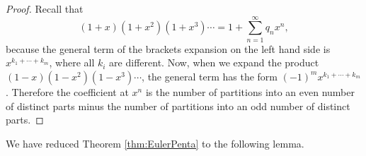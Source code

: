 

\setcounter{section}{3}
\setcounter{subsection}{8}
\setcounter{dfn}{21}

\begin{proof}
Recall that
\[
(1+x)(1+x^2)(1+x^3) \cdots = 1 + \sum_{n=1}^\infty q_n x^n,
\]
because the general term of the brackets expansion on the left hand side is $x^{k_1 + \cdots + k_m}$, where all $k_i$ are different.
Now, when we expand the product $(1-x)(1-x^2)(1-x^3)\cdots$, the general term has the form $(-1)^m x^{k_1 + \cdots + k_m}$.
Therefore the coefficient at $x^n$ is the number of partitions into an even number of distinct parts
minus the number of partitions into an odd number of distinct parts.
\end{proof}

We have reduced Theorem \ref{thm:EulerPenta} to the following lemma.


